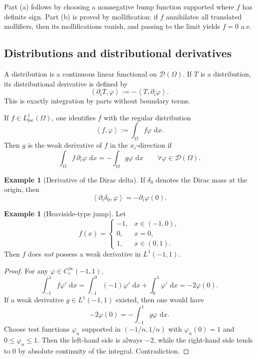 \documentclass[11pt]{article}
\theoremstyle{definition}
\newtheorem{example}[theorem]{Example}
\newcommand{\dd}{\,\mathrm{d}}
\newcommand{\ip}[2]{\left\langle #1,#2\right\rangle}
\begin{document}
Part (a) follows by choosing a nonnegative bump function supported where $f$ has definite sign. Part (b) is proved by mollification: if $f$ annihilates all translated mollifiers, then its mollifications vanish, and passing to the limit yields $f=0$ a.e.

\subsection{Distributions and distributional derivatives}

A distribution is a continuous linear functional on $\mathscr{D}(\Omega)$. If $T$ is a distribution, its distributional derivative is defined by
\[
\ip{\partial_i T}{\varphi} := -\ip{T}{\partial_i\varphi}.
\]
This is exactly integration by parts without boundary terms.

If $f\in L^1_{\mathrm{loc}}(\Omega)$, one identifies $f$ with the regular distribution
\[
\ip{f}{\varphi} := \int_\Omega f\varphi\,\dd x.
\]
Then $g$ is the weak derivative of $f$ in the $x_i$-direction if
\[
\int_\Omega f\,\partial_i\varphi\,\dd x = -\int_\Omega g\varphi\,\dd x
\qquad \forall \varphi\in \mathscr{D}(\Omega).
\]

\begin{example}[Derivative of the Dirac delta]
If $\delta_0$ denotes the Dirac mass at the origin, then
\[
\ip{\partial_i\delta_0}{\varphi} = -\partial_i\varphi(0).
\]
\end{example}

\begin{example}[Heaviside-type jump]
Let
\[
f(x)=
\begin{cases}
-1, & x\in(-1,0),\\
0, & x=0,\\
1, & x\in(0,1).
\end{cases}
\]
Then $f$ does \emph{not} possess a weak derivative in $L^1(-1,1)$.
\end{example}

\begin{proof}
For any $\varphi\in C_c^\infty(-1,1)$,
\[
\int_{-1}^1 f\varphi'\,\dd x
= \int_{-1}^0 (-1)\varphi'\,\dd x + \int_0^1 \varphi'\,\dd x
= -2\varphi(0).
\]
If a weak derivative $g\in L^1(-1,1)$ existed, then one would have
\[
-2\varphi(0) = -\int_{-1}^1 g\varphi\,\dd x.
\]
Choose test functions $\varphi_n$ supported in $(-1/n,1/n)$ with $\varphi_n(0)=1$ and $0\le \varphi_n\le 1$. Then the left-hand side is always $-2$, while the right-hand side tends to $0$ by absolute continuity of the integral. Contradiction.
\end{proof}
\end{document}
